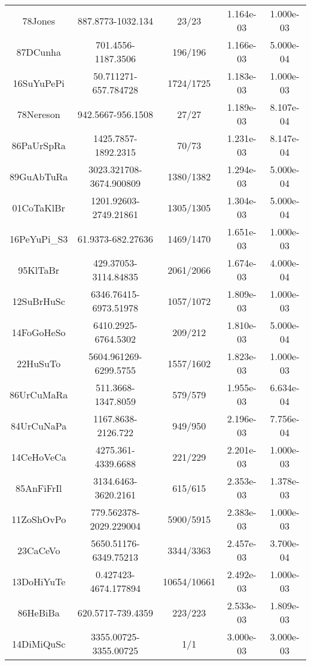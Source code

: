 \begin{longtable}{c c c c c}
78Jones \cite{78Jones} & 887.8773-1032.134 & 23/23 & 1.164e-03 & 1.000e-03 \\
87DCunha \cite{87DCunha} & 701.4556-1187.3506 & 196/196 & 1.166e-03 & 5.000e-04 \\
16SuYuPePi \cite{16SuYuPePi} & 50.711271-657.784728 & 1724/1725 & 1.183e-03 & 1.000e-03 \\
78Nereson \cite{78Nereson} & 942.5667-956.1508 & 27/27 & 1.189e-03 & 8.107e-04 \\
86PaUrSpRa \cite{86PaUrSpRa} & 1425.7857-1892.2315 & 70/73 & 1.231e-03 & 8.147e-04 \\
89GuAbTuRa \cite{89GuAbTuRa} & 3023.321708-3674.900809 & 1380/1382 & 1.294e-03 & 5.000e-04 \\
01CoTaKlBr \cite{01CoTaKlBr} & 1201.92603-2749.21861 & 1305/1305 & 1.304e-03 & 5.000e-04 \\
16PeYuPi_S3 \cite{16PeYuPi_S3} & 61.9373-682.27636 & 1469/1470 & 1.651e-03 & 1.000e-03 \\
95KlTaBr \cite{95KlTaBr} & 429.37053-3114.84835 & 2061/2066 & 1.674e-03 & 4.000e-04 \\
12SuBrHuSc \cite{12SuBrHuSc} & 6346.76415-6973.51978 & 1057/1072 & 1.809e-03 & 1.000e-03 \\
14FoGoHeSo \cite{14FoGoHeSo} & 6410.2925-6764.5302 & 209/212 & 1.810e-03 & 5.000e-04 \\
22HuSuTo \cite{22HuSuTo} & 5604.961269-6299.5755 & 1557/1602 & 1.823e-03 & 1.000e-03 \\
86UrCuMaRa \cite{86UrCuMaRa} & 511.3668-1347.8059 & 579/579 & 1.955e-03 & 6.634e-04 \\
84UrCuNaPa \cite{84UrCuNaPa} & 1167.8638-2126.722 & 949/950 & 2.196e-03 & 7.756e-04 \\
14CeHoVeCa \cite{14CeHoVeCa} & 4275.361-4339.6688 & 221/229 & 2.201e-03 & 1.000e-03 \\
85AnFiFrIl \cite{85AnFiFrIl} & 3134.6463-3620.2161 & 615/615 & 2.353e-03 & 1.378e-03 \\
11ZoShOvPo \cite{11ZoShOvPo} & 779.562378-2029.229004 & 5900/5915 & 2.383e-03 & 1.000e-03 \\
23CaCeVo \cite{23CaCeVo} & 5650.51176-6349.75213 & 3344/3363 & 2.457e-03 & 3.700e-04 \\
13DoHiYuTe \cite{13DoHiYuTe} & 0.427423-4674.177894 & 10654/10661 & 2.492e-03 & 1.000e-03 \\
86HeBiBa \cite{86HeBiBa} & 620.5717-739.4359 & 223/223 & 2.533e-03 & 1.809e-03 \\
14DiMiQuSc \cite{14DiMiQuSc} & 3355.00725-3355.00725 & 1/1 & 3.000e-03 & 3.000e-03 \\

\end{longtable}
